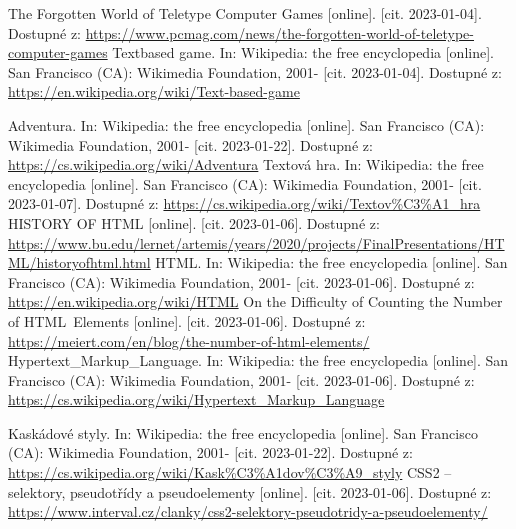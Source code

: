 \documentclass[main.tex]{subfiles}
\begin{document}
\renewcommand{\refname}{Seznam použité literatury a~zdrojů informací} 

\begin{thebibliography}{99}


 The Forgotten World of Teletype Computer Games [online]. [cit. 2023-01-04]. Dostupné z: \url{https://www.pcmag.com/news/the-forgotten-world-of-teletype-computer-games}
 Textbased game. In: Wikipedia: the free encyclopedia [online]. San Francisco (CA): Wikimedia Foundation, 2001- [cit. 2023-01-04]. Dostupné z: \url{https://en.wikipedia.org/wiki/Text-based-game}

 Adventura. In: Wikipedia: the free encyclopedia [online]. San Francisco (CA): Wikimedia Foundation, 2001- [cit. 2023-01-22]. Dostupné z: \url{https://cs.wikipedia.org/wiki/Adventura}
 Textová hra. In: Wikipedia: the free encyclopedia [online]. San Francisco (CA): Wikimedia Foundation, 2001- [cit. 2023-01-07]. Dostupné z: \url{https://cs.wikipedia.org/wiki/Textov\%C3\%A1\_hra}
 HISTORY OF HTML [online]. [cit. 2023-01-06]. Dostupné z: \url{https://www.bu.edu/lernet/artemis/years/2020/projects/FinalPresentations/HTML/historyofhtml.html} 
 HTML. In: Wikipedia: the free encyclopedia [online]. San Francisco (CA): Wikimedia Foundation, 2001- [cit. 2023-01-06]. Dostupné z: \url{https://en.wikipedia.org/wiki/HTML}
 On the Difficulty of Counting the Number of HTML Elements [online]. [cit. 2023-01-06]. Dostupné z: \url{https://meiert.com/en/blog/the-number-of-html-elements/}
 Hypertext\_Markup\_Language. In: Wikipedia: the free encyclopedia [online]. San Francisco (CA): Wikimedia Foundation, 2001- [cit. 2023-01-06]. Dostupné z: \url{https://cs.wikipedia.org/wiki/Hypertext\_Markup\_Language}

 Kaskádové styly. In: Wikipedia: the free encyclopedia [online]. San Francisco (CA): Wikimedia Foundation, 2001- [cit. 2023-01-22]. Dostupné z: \url{https://cs.wikipedia.org/wiki/Kask\%C3\%A1dov\%C3\%A9\_styly}
 CSS2 – selektory, pseudotřídy a pseudoelementy [online]. [cit. 2023-01-06]. Dostupné z: \url{https://www.interval.cz/clanky/css2-selektory-pseudotridy-a-pseudoelementy/}


\end{thebibliography}
\end{document}
